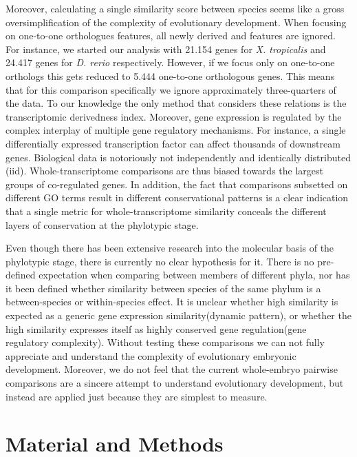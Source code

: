 Moreover, calculating a single similarity score between species seems like a gross oversimplification of the complexity of evolutionary development. When focusing on one-to-one orthologues features, all newly derived and features are ignored. For instance, we started our analysis with 21.154 genes for \textit{X. tropicalis} and 24.417 genes for \textit{D. rerio} respectively. However, if we focus only on one-to-one orthologs this gets reduced to 5.444 one-to-one orthologous genes. This means that for this comparison specifically we ignore approximately three-quarters of the data. To our knowledge the only method that considers these relations is the transcriptomic derivedness index\cite{Leong2021}. Moreover, gene expression is regulated by the complex interplay of multiple gene regulatory mechanisms. For instance, a single differentially expressed transcription factor can affect thousands of downstream genes. Biological data is notoriously not independently and identically distributed (iid). Whole-transcriptome comparisons are thus biased towards the largest groups of co-regulated genes. In addition, the fact that comparisons subsetted on different GO terms result in different conservational patterns is a clear indication that a single metric for whole-transcriptome similarity conceals the different layers of conservation at the phylotypic stage\cite{Malik2017,Gildor2019,Onimaru2021}.

Even though there has been extensive research into the molecular basis of the phylotypic stage, there is currently no clear hypothesis for it. There is no pre-defined expectation when comparing between members of different phyla, nor has it been defined whether similarity between species of the same phylum is a between-species or within-species effect. It is unclear whether high similarity is expected as a generic gene expression similarity(dynamic pattern), or whether the high similarity expresses itself as highly conserved gene regulation(gene regulatory complexity). Without testing these comparisons we can not fully appreciate and understand the complexity of evolutionary embryonic development. Moreover, we do not feel that the current whole-embryo pairwise comparisons are a sincere attempt to understand evolutionary development, but instead are applied just because they are simplest to measure. 

\section{Material and Methods}


